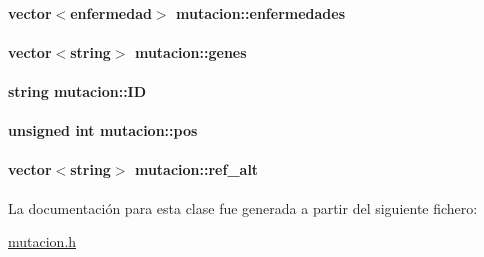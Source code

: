 \hypertarget{classmutacion_a0decaa0406675999e766f913e6347d79}{
\paragraph[{enfermedades}]{\setlength{\rightskip}{0pt plus 5cm}vector$<${\bf enfermedad}$>$ mutacion\-::enfermedades\hspace{0.3cm}{\ttfamily [private]}}}\label{classmutacion_a0decaa0406675999e766f913e6347d79}
\hypertarget{classmutacion_a65fb9e2186d1c54d490289661b141aa1}{
\paragraph[{genes}]{\setlength{\rightskip}{0pt plus 5cm}vector$<$string$>$ mutacion\-::genes\hspace{0.3cm}{\ttfamily [private]}}}\label{classmutacion_a65fb9e2186d1c54d490289661b141aa1}
\hypertarget{classmutacion_aafc39218473e0f21eb0c3dc05dd4f35e}{
\paragraph[{I\-D}]{\setlength{\rightskip}{0pt plus 5cm}string mutacion\-::\-I\-D\hspace{0.3cm}{\ttfamily [private]}}}\label{classmutacion_aafc39218473e0f21eb0c3dc05dd4f35e}
\hypertarget{classmutacion_ae1487b8648d0eaad68de5e4e5a87f3ff}{
\paragraph[{pos}]{\setlength{\rightskip}{0pt plus 5cm}unsigned int mutacion\-::pos\hspace{0.3cm}{\ttfamily [private]}}}\label{classmutacion_ae1487b8648d0eaad68de5e4e5a87f3ff}
\hypertarget{classmutacion_abeb13e023fc9a34120106bccf58d5086}{
\paragraph[{ref\-\_\-alt}]{\setlength{\rightskip}{0pt plus 5cm}vector$<$string$>$ mutacion\-::ref\-\_\-alt\hspace{0.3cm}{\ttfamily [private]}}}\label{classmutacion_abeb13e023fc9a34120106bccf58d5086}


La documentación para esta clase fue generada a partir del siguiente fichero\-:\begin{DoxyCompactItemize}
\item 
\hyperlink{mutacion_8h}{mutacion.\-h}\end{DoxyCompactItemize}
